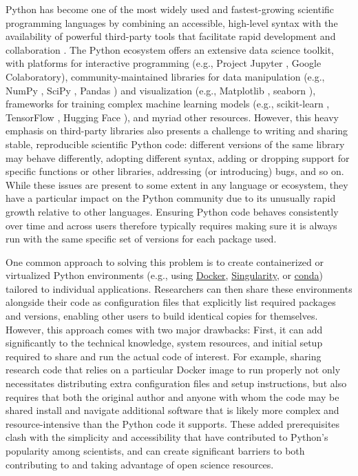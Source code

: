 \documentclass[preprint,12pt, a4paper]{elsarticle}
\begin{document}
Python has become one of the most widely used and fastest-growing scientific programming languages by combining an accessible, high-level syntax with the availability of powerful third-party tools that facilitate rapid development and collaboration \cite{MullEtal15}. The Python ecosystem offers an extensive data science toolkit, with platforms for interactive programming (e.g., Project Jupyter \cite{KluyEtal16}, Google Colaboratory), community-maintained libraries for data manipulation (e.g., NumPy \cite{HarrEtal20}, SciPy \cite{VirtEtal20}, Pandas \cite{McKi10}) and visualization (e.g., Matplotlib \cite{Hunt07}, seaborn \cite{Wask21}), frameworks for training complex machine learning models (e.g., scikit-learn \cite{PedrEtal11}, TensorFlow \cite{AbadEtal15}, Hugging Face \cite{WolfEtal20}), and myriad other resources. However, this heavy emphasis on third-party libraries also presents a challenge to writing and sharing stable, reproducible scientific Python code: different versions of the same library may behave differently, adopting different syntax, adding or dropping support for specific functions or other libraries, addressing (or introducing) bugs, and so on. While these issues are present to some extent in any language or ecosystem, they have a particular impact on the Python community due to its unusually rapid growth relative to other languages. Ensuring Python code behaves consistently over time and across users therefore typically requires making sure it is always run with the same specific set of versions for each package used. 

One common approach to solving this problem is to create containerized or virtualized Python environments (e.g., using \href{https://www.docker.com/}{Docker}, \href{https://sylabs.io/singularity/}{Singularity}, or \href{https://docs.conda.io/en/latest/}{conda}) tailored to individual applications. Researchers can then share these environments alongside their code as configuration files that explicitly list required packages and versions, enabling other users to build identical copies for themselves. However, this approach comes with two major drawbacks: First, it can add significantly to the technical knowledge, system resources, and initial setup required to share and run the actual code of interest. For example, sharing research code that relies on a particular Docker image to run properly not only necessitates distributing extra configuration files and setup instructions, but also requires that both the original author and anyone with whom the code may be shared install and navigate additional software that is likely more complex and resource-intensive than the Python code it supports. These added prerequisites clash with the simplicity and accessibility that have contributed to Python's popularity among scientists, and can create significant barriers to both contributing to and taking advantage of open science resources.
\end{document}
